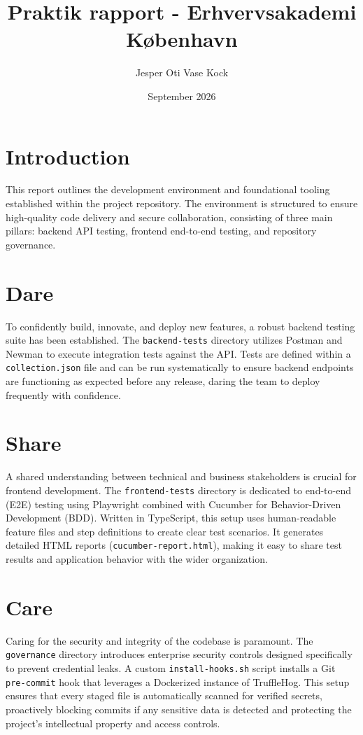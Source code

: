 \documentclass{article}
\title{Praktik rapport - Erhvervsakademi København}
\author{Jesper Oti Vase Kock}
\date{September 2026}
\begin{document}
\maketitle

\tableofcontents

\pagebreak

\section{Introduction}
This report outlines the development environment and foundational tooling established within the project repository. The environment is structured to ensure high-quality code delivery and secure collaboration, consisting of three main pillars: backend API testing, frontend end-to-end testing, and repository governance.

\section{Dare}
To confidently build, innovate, and deploy new features, a robust backend testing suite has been established. The \texttt{backend-tests} directory utilizes Postman and Newman to execute integration tests against the API. Tests are defined within a \texttt{collection.json} file and can be run systematically to ensure backend endpoints are functioning as expected before any release, daring the team to deploy frequently with confidence.

\section{Share}
A shared understanding between technical and business stakeholders is crucial for frontend development. The \texttt{frontend-tests} directory is dedicated to end-to-end (E2E) testing using Playwright combined with Cucumber for Behavior-Driven Development (BDD). Written in TypeScript, this setup uses human-readable feature files and step definitions to create clear test scenarios. It generates detailed HTML reports (\texttt{cucumber-report.html}), making it easy to share test results and application behavior with the wider organization.

\section{Care}
Caring for the security and integrity of the codebase is paramount. The \texttt{governance} directory introduces enterprise security controls designed specifically to prevent credential leaks. A custom \texttt{install-hooks.sh} script installs a Git \texttt{pre-commit} hook that leverages a Dockerized instance of TruffleHog. This setup ensures that every staged file is automatically scanned for verified secrets, proactively blocking commits if any sensitive data is detected and protecting the project's intellectual property and access controls.
\end{document}
